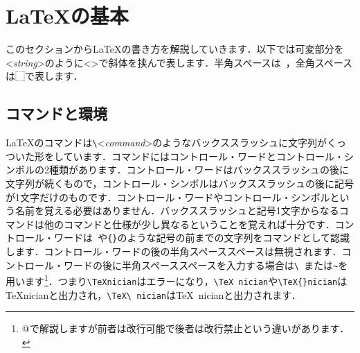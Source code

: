 \section{\LaTeX の基本}
このセクションから\LaTeX の書き方を解説していきます．以下では可変部分を<\textit{string}>のように<>で斜体を挟んで表します．半角スペースは\verb*| |，全角スペースは⬚で表します．
\subsection{コマンドと環境}
\LaTeX のコマンドは\verb|\|<\textit{command}>のようなバックススラッシュに文字列がくっついた形をしています．コマンドにはコントロール・ワードとコントロール・シンボルの2種類があります．コントロール・ワードはバックススラッシュの後に文字列が続くもので，コントロール・シンボルはバックススラッシュの後に記号が1文字だけのものです．コントロール・ワードやコントロール・シンボルという名前を覚える必要はありません．バックススラッシュと記号1文字からなるコマンドは他のコマンドと仕様が少し異なるということを覚えれば十分です．コントロール・ワードは\verb*| |や\verb*|{}|のような記号の前までの文字列をコマンドとして認識します．コントロール・ワードの後の半角スペーススペースは無視されます．コントロール・ワードの後に半角スペーススペースを入力する場合は\verb*|\ |または\verb*|~|を用います\footnote{@で解説しますが前者は改行可能で後者は改行禁止という違いがあります．}．つまり\verb*|\TeXnician|はエラーになり，\verb*|\TeX nician|や\verb*|\TeX{}nician|は\TeX nicianと出力され，\verb*|\TeX\ nician|は\TeX\ nicianと出力されます．